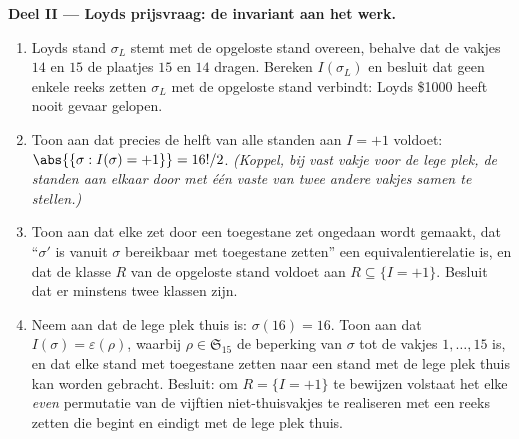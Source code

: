 \begin{problem}
\medskip
\noindent\textbf{Deel II --- Loyds prijsvraag: de invariant aan
het werk.}
\begin{enumerate}[resume]
  \item Loyds stand $\sigma_L$ stemt met de opgeloste stand
        overeen, behalve dat de vakjes $14$ en $15$ de plaatjes
        $15$ en $14$ dragen. Bereken $I(\sigma_L)$ en besluit dat
        geen enkele reeks zetten $\sigma_L$ met de opgeloste stand
        verbindt: Loyds \$1000 heeft nooit gevaar gelopen.
  \item Toon aan dat precies de helft van alle standen aan $I =
        +1$ voldoet: $\abs{\{\sigma : I(\sigma) = +1\}} = 16!/2$.
        \emph{(Koppel, bij vast vakje voor de lege plek, de
        standen aan elkaar door met één vaste  van
        twee andere vakjes samen te stellen.)}
  \item Toon aan dat elke zet door een toegestane zet ongedaan
        wordt gemaakt, dat ``$\sigma'$ is vanuit $\sigma$
        bereikbaar met toegestane zetten'' een equivalentierelatie
        is, en dat de klasse $R$ van de opgeloste stand voldoet
        aan $R \subseteq \{I = +1\}$. Besluit dat er minstens twee
        klassen zijn.
  \item Neem aan dat de lege plek thuis is: $\sigma(16) = 16$.
        Toon aan dat $I(\sigma) = \varepsilon(\rho)$, waarbij
        $\rho \in \mathfrak{S}_{15}$ de beperking van $\sigma$ tot
        de vakjes $1, \dots, 15$ is, en dat elke stand met
        toegestane zetten naar een stand met de lege plek thuis
        kan worden gebracht. Besluit: om $R = \{I = +1\}$ te
        bewijzen volstaat het elke \emph{even} permutatie van de
        vijftien niet-thuisvakjes te realiseren met een reeks
        zetten die begint en eindigt met de lege plek thuis.
\end{enumerate}


\end{problem}
